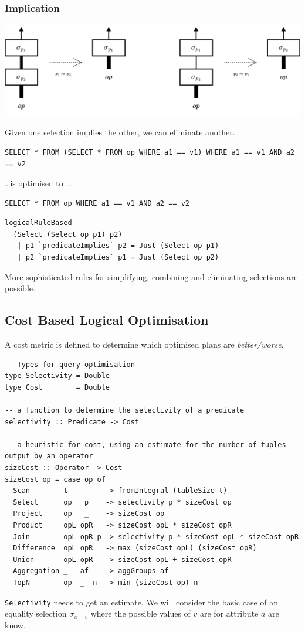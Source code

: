 \subsubsection{Implication}
\begin{center}
    \includegraphics[width=.9\textwidth]{optimisation/images/implies_elimination.drawio.png}
\end{center}
Given one selection implies the other, we can eliminate another.
\begin{verbatim}
SELECT * FROM (SELECT * FROM op WHERE a1 == v1) WHERE a1 == v1 AND a2 == v2 
\end{verbatim}
\dots is optimised to \dots
\begin{verbatim}
SELECT * FROM op WHERE a1 == v1 AND a2 == v2 
\end{verbatim}
\begin{verbatim}
logicalRuleBased
  (Select (Select op p1) p2) 
   | p1 `predicateImplies` p2 = Just (Select op p1)
   | p2 `predicateImplies` p1 = Just (Select op p2)  
\end{verbatim}

More sophisticated rules for simplifying, combining and eliminating selections are possible.

\subsection{Cost Based Logical Optimisation}
A cost metric is defined to determine which optimised plans are \textit{better/worse}.
\begin{verbatim}
-- Types for query optimisation
type Selectivity = Double
type Cost        = Double

-- a function to determine the selectivity of a predicate
selectivity :: Predicate -> Cost

-- a heuristic for cost, using an estimate for the number of tuples output by an operator
sizeCost :: Operator -> Cost
sizeCost op = case op of
  Scan        t         -> fromIntegral (tableSize t)
  Select      op   p    -> selectivity p * sizeCost op
  Project     op   _    -> sizeCost op
  Product     opL opR   -> sizeCost opL * sizeCost opR
  Join        opL opR p -> selectivity p * sizeCost opL * sizeCost opR
  Difference  opL opR   -> max (sizeCost opL) (sizeCost opR)
  Union       opL opR   -> sizeCost opL + sizeCost opR
  Aggregation _   af    -> aggGroups af
  TopN        op  _  n  -> min (sizeCost op) n
\end{verbatim}
\texttt{Selectivity} needs to get an estimate. We will consider the basic case of an equality selection $\sigma_{a = v}$ where the possible values of $v$ are for attribute $a$ are know.
